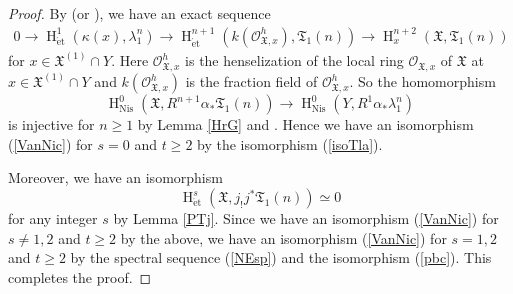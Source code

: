 \documentclass{article}
\newcommand{\et}{\mathrm{\acute{e}t}}
\newcommand{\Nis}{\mathrm{Nis}}
\newcommand{\HO}{\operatorname{H}}
\begin{document}
\begin{proof}
By \cite[p.31, Theorem 1.2]{SM} (or \cite[Theorem 1.4]{Sak4}), we have an exact sequence
%
\begin{align*}
0\to   
\HO^{1}_{\et}(
\kappa(x),
\lambda_{1}^{n}
)
\to
\HO^{n+1}_{\et}(
k(\mathcal{O}_{\mathfrak{X}, x}^{h}),
\mathfrak{T}_{1}(n)
)
\to
\HO^{n+2}_{x}(
\mathfrak{X},
\mathfrak{T}_{1}(n)
)
\end{align*}
%
for $x\in \mathfrak{X}^{(1)}\cap Y$.
Here $\mathcal{O}_{\mathfrak{X}, x}^{h}$ is the henselization of
the local ring $\mathcal{O}_{\mathfrak{X}, x}$ of $\mathfrak{X}$ at $x\in \mathfrak{X}^{(1)}\cap Y$
and $k(\mathcal{O}^{h}_{\mathfrak{X}, x})$ is the fraction field of
$\mathcal{O}^{h}_{\mathfrak{X}, x}$. So the homomorphism
%
\begin{equation*}
\HO^{0}_{\Nis}(
\mathfrak{X}, 
R^{n+1}\alpha_{*}\mathfrak{T}_{1}(n)
)    
\to
\HO^{0}_{\Nis}(
Y,
R^{1}\alpha_{*}\lambda_{1}^{n}
)
\end{equation*}
%
is injective for $n\geq 1$ by Lemma \ref{HrG} and
\cite[Theorem 1.7]{Sak4}.
Hence we have an isomorphism (\ref{VanNic}) for $s=0$ and
$t\geq 2$ by the isomorphism (\ref{isoTla}).


Moreover,
we have an isomorphism
%
\begin{equation}\label{pbc}
\HO_{\et}^{s}(\mathfrak{X}, j_{!}j^{*}
\mathfrak{T}_{1}(n)
)
\simeq
0
\end{equation}
%
for any integer $s$ by Lemma \ref{PTj}. Since we have an isomorphism (\ref{VanNic}) for 
$s\neq 1, 2$ and $t\geq 2$ by the above, we have an isomorphism (\ref{VanNic})
for $s=1, 2$ and $t\geq 2$ by the spectral sequence (\ref{NEsp}) and the isomorphism (\ref{pbc}).
This completes the proof.

\end{proof}
%
\end{document}

